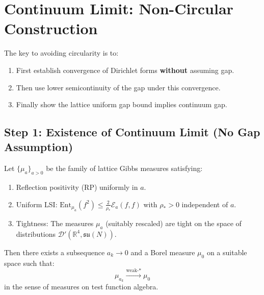 \section{Continuum Limit: Non-Circular Construction}
\label{sec:continuum_limit_noncircular}

The key to avoiding circularity is to:
\begin{enumerate}
    \item First establish convergence of Dirichlet forms \textbf{without} assuming gap.
    \item Then use lower semicontinuity of the gap under this convergence.
    \item Finally show the lattice uniform gap bound implies continuum gap.
\end{enumerate}

\subsection{Step 1: Existence of Continuum Limit (No Gap Assumption)}

\begin{theorem}\label{thm:continuum_existence}
Let $\{\mu_a\}_{a > 0}$ be the family of lattice Gibbs measures satisfying:
\begin{enumerate}
    \item Reflection positivity (RP) uniformly in $a$.
    \item Uniform LSI: $\text{Ent}_{\mu_a}(f^2) \leq \frac{2}{\rho_*} \mathcal{E}_a(f,f)$ with $\rho_* > 0$ independent of $a$.
    \item Tightness: The measures $\mu_a$ (suitably rescaled) are tight on the space of distributions $\mathcal{D}'(\mathbb{R}^4, \mathfrak{su}(N))$.
\end{enumerate}
Then there exists a subsequence $a_k \to 0$ and a Borel measure $\mu_0$ on a suitable space such that:
\begin{equation}
    \mu_{a_k} \xrightarrow{\text{weak-*}} \mu_0
\end{equation}
in the sense of measures on test function algebra.
\end{theorem}

